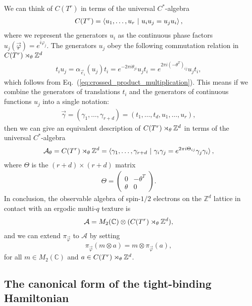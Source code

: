 \documentclass[submission, Phys]{SciPost}
\begin{document}
We can think of $C(T^r)$ in terms of the universal $C^\ast$-algebra
\begin{align}
    C(T^r) = \braket{ u_1, \ldots, u_r ~|~ u_i u_j = u_j u_i},
\end{align}
where we represent the generators $u_i$ as the continuous phase factors $u_j(\vec{\varphi})= e^{i \varphi_j }$.
The generators $u_j$ obey the following commutation relation in $C(T^r)\rtimes_{\theta} \mathbb{Z}^d$
\begin{align}
    t_i u_j = \alpha_{\vec{e}_i}(u_j) t_i = e^{-2\pi i \theta_{ji}} u_j t_i
    =  e^{2\pi i (-\theta^T)_{ij}} u_j t_i,
\end{align}
which follows from Eq.~(\ref{eq:crossed_product_multiplication}).
This means if we combine the generators of translations $t_i$ and the generators of continuous functions $u_j$ into a single notation:
\begin{align}
    \vec{\gamma} = (\gamma_1,\ldots, \gamma_{r+d}) = (t_1, \ldots, t_d, u_1, \ldots, u_r),
\end{align}
then we can give an equivalent description of $C(T^r)\rtimes_{\theta} \mathbb{Z}^d$ in terms of the universal $C^\ast$-algebra
\begin{align}
    \mathcal{A}_\theta = C(T^r)\rtimes_{\theta} \mathbb{Z}^d
    = \braket{\gamma_1,\ldots, \gamma_{r+d} ~|~ 
    \gamma_i \gamma_j =  e^{2\pi i \Theta_{ij}}
    \gamma_j \gamma_i},
\end{align}
where $\Theta$ is the $(r+d) \times (r+d)$ matrix
\begin{align}
    \Theta = \begin{pmatrix}
        0 & -\theta^T \\
        \theta & 0 
    \end{pmatrix} .
\end{align}
In conclusion, the observable algebra of spin-$1/2$ electrons on the $\mathbb{Z}^d$ lattice in contact with an ergodic multi-$q$ texture is 
\begin{align}
    \mathcal{A} = M_2(\mathbb{C}) \otimes  ( C(T^r)\rtimes_{\theta} \mathbb{Z}^d ),
\end{align}
and we can extend $\pi_{\vec{\varphi}}$ to $\mathcal{A}$ by setting
\begin{equation}
    \pi_{\vec{\varphi}}(m \otimes a) = m \otimes \pi_{\vec{\varphi}}(a),
\end{equation}
for all $m \in M_2(\mathbb{C})$ and $a \in C(T^r)\rtimes_{\theta} \mathbb{Z}^d $.

\subsection{The canonical form of the tight-binding Hamiltonian}
\label{subsec:canonicalHamiltomian}
\end{document}
